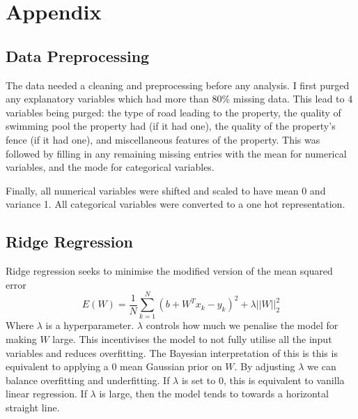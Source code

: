 \documentclass[11pt, twoside]{article}
\begin{document}
\appendix
\section{Appendix}
\subsection{Data Preprocessing}
The data needed a cleaning and preprocessing before any analysis. I first purged any explanatory variables which had more than 80\% missing data. This lead to 4 variables being purged: the type of road leading to the property, the quality of swimming pool the property had (if it had one), the quality of the property's fence (if it had one), and miscellaneous features of the property. This was followed by filling in any remaining missing entries with the mean for numerical variables, and the mode for categorical variables.

Finally, all numerical variables were shifted and scaled to have mean 0 and variance 1. All categorical variables were converted to a one hot representation.

\subsection{Ridge Regression}
Ridge regression seeks to minimise the modified version of the mean squared error
\[E(W) = \frac{1}{N} \sum_{k=1}^N (b + W^T x_k - y_k)^2 + \lambda ||W||_2^2\]
Where $\lambda$ is a hyperparameter. $\lambda$ controls how much we penalise the model for making $W$ large. This incentivises the model to not fully utilise all the input variables and reduces overfitting. The Bayesian interpretation of this is this is equivalent to applying a 0 mean Gaussian prior on $W$. By adjusting $\lambda$ we can balance overfitting and underfitting. If $\lambda$ is set to 0, this is equivalent to vanilla linear regression. If $\lambda$ is large, then the model tends to towards a horizontal straight line. 
\end{document}
